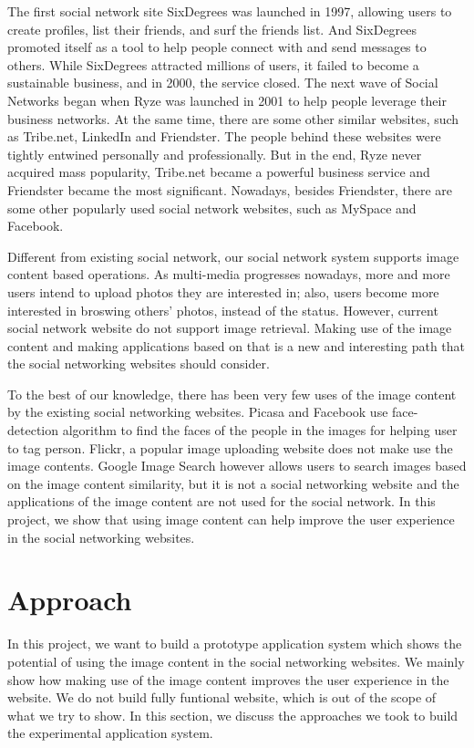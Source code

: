 \documentclass[10pt,twocolumn,letterpaper]{article}
\begin{document}
The first social network site SixDegrees was launched in 1997, allowing users to create profiles, list their friends, and surf the friends list. And SixDegrees promoted itself as a tool to help people connect with and send messages to others. While SixDegrees attracted millions of users, it failed to become a sustainable business, and in 2000, the service closed. The next wave of Social Networks began when Ryze was launched in 2001 to help people leverage their business networks. At the same time, there are some other similar websites, such as Tribe.net, LinkedIn and Friendster. The people behind these websites were tightly entwined personally and professionally. But in the end, Ryze never acquired mass popularity, Tribe.net became a powerful business service and Friendster became the most significant. Nowadays, besides Friendster, there are some other popularly used social network websites, such as MySpace and Facebook.

Different from existing social network, our social network system supports image content based operations. As multi-media progresses nowadays, more and more users intend to upload photos they are interested in; also, users become more interested in broswing others' photos, instead of the status. However, current social network website do not support image retrieval. Making use of the image content and making applications based on that is a new and interesting path that the social networking websites should consider. 

To the best of our knowledge, there has been very few uses of the image content by the existing social networking websites. Picasa and Facebook use face-detection algorithm to find the faces of the people in the images for helping user to tag person. Flickr, a popular image uploading website does not make use the image contents. Google Image Search however allows users to search images based on the image content similarity, but it is not a social networking website and the applications of the image content are not used for the social network. In this project, we show that using image content can help improve the user experience in the social networking websites.

\section{Approach}
In this project, we want to build a prototype application system which shows the potential of using the image content in the social networking websites. We mainly show how making use of the image content improves the user experience in the website. We do not build fully funtional website, which is out of the scope of what we try to show. In this section, we discuss the approaches we took to build the experimental application system.
\end{document}
